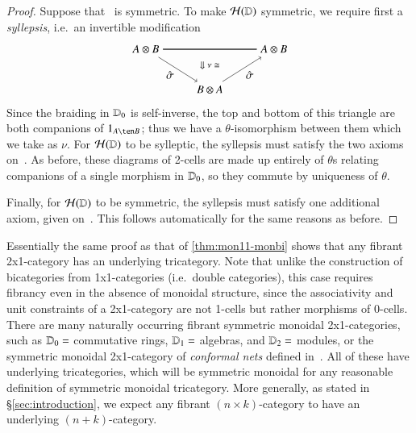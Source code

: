 \begin{proof}
Suppose that \lD\ is symmetric.  To make $\mathcal{H}(\mathbb{D})$ symmetric,
  we require first a \emph{syllepsis}, i.e.\ an invertible
  modification
  \[
 \begin{tikzpicture}
 \node (tl) at (-2,1) {$A \otimes B$};
 \node (tr) at (2,1) {$A \otimes B$};
 \node (b) at (0,-.25) {$B \otimes A$};
 \draw[double] (tl)  -- (tr);
 \draw[->] (tl) to node[left, yshift=-5pt]{$\hat{\sigma}$} (b);
 \draw[->] (b) to node[right, yshift=-5pt] {$\hat{\sigma}$}(tr);
 \node at (0,0.5) {\footnotesize $\Downarrow \nu\iso$}; 
 \end{tikzpicture}
 \]
  Since the braiding in $\mathbb{D}_0$ is self-inverse, the top and bottom of
  this triangle are both companions of $1_{A\ten B}$; thus we have a
  $\theta$-isomorphism between them which we take as $\nu$.  For
  $\mathcal{H}(\mathbb{D})$ to be sylleptic, the syllepsis must satisfy the two
  axioms on~\cite[p144--145]{mccrudden:bal-coalgb}.  As before, these
  diagrams of 2-cells are made up entirely of $\theta$s relating
  companions of a single morphism in $\mathbb{D}_0$, so they commute by
  uniqueness of $\theta$.



  Finally, for $\mathcal{H}(\mathbb{D})$ to be symmetric, the syllepsis must satisfy
  one additional axiom, given on~\cite[p91]{mccrudden:bal-coalgb}.
  This follows automatically for the same reasons as before.
\end{proof}




\begin{rmk}
  Essentially the same proof as that of \autoref{thm:mon11-monbi}
  shows that any fibrant 2x1-category has an underlying tricategory.
  Note that unlike the construction of bicategories from
  1x1-categories (i.e.\ double categories), this case requires
  fibrancy even in the absence of monoidal structure, since the
  associativity and unit constraints of a 2x1-category are not 1-cells
  but rather morphisms of 0-cells.  There are many naturally occurring
  fibrant symmetric monoidal 2x1-categories, such as $\mathbb{D}_0=$
  commutative rings, $\mathbb{D}_1=$ algebras, and $\mathbb{D}_2=$ modules, or the
  symmetric monoidal 2x1-category of \emph{conformal nets} defined
  in~\cite{bdh:confnets-i}.  All of these have underlying
  tricategories, which will be symmetric monoidal for any reasonable
  definition of symmetric monoidal tricategory.  More generally, as
  stated in \S\ref{sec:introduction}, we expect any fibrant $(n\times
  k)$-category to have an underlying $(n+k)$-category.
\end{rmk}

